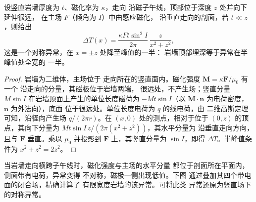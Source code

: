 \begin{proposition}[薄岩墙的异常]\label{prop:b3:field-lab-methods-3:dyke}
设竖直岩墙厚度为 $t$、磁化率为 $\kappa$，走向
沿磁子午线，顶部位于深度 $z$ 处并向下延伸很远，
在主场 $F$（倾角为 $I$）中由感应磁化，
沿垂直走向的剖面，若 $t \ll z$，则给出
\[
\Delta T(x) = \frac{\kappa F t\sin^2 I}{2\pi}\,\frac{z}{x^2 + z^2} ,
\]
这是一个对称异常，在 $x = \pm z$ 处降至峰值的一半：
岩墙顶部埋深等于异常在半峰值处全宽的
一半。
\end{proposition}

\begin{proof}
岩墙为二维体，主场位于
走向所在的竖直面内。磁化强度 $\mathbf{M} = \kappa\mathbf{F}/\mu_0$ 有一个
沿走向的分量，其磁极位于岩墙两端，
很远处，不产生场；竖直分量 $M
\sin I$ 在岩墙顶面上产生的单位长度磁荷为
$-Mt\sin I$（以 $\mathbf{M}\cdot\mathbf{n}$ 为电荷密度，
$\mathbf{n}$ 为外法向），底面
位于很远处。单位长度电荷为 $q$ 的线电荷，由
二维高斯定理可知，沿径向产生场 $q/(2\pi r)$。在
$(x, 0)$ 处的测点，相对于位于 $(0, z)$ 的顶点，其向下分量为
$Mt\sin I\,z/(2\pi(x^2 + z^2))$，其水平分量为
沿垂直走向方向，且与 $\mathbf{F}$ 垂直。乘以
$\mu_0$ 并投影到 $\mathbf{F}$ 上，其竖直分量为
$\sin I$，即得 $\Delta T$。半峰值条件为 $x^2 + z^2 =
2z^2$。
\end{proof}

当岩墙走向横跨子午线时，磁化强度与主场的水平分量
都位于剖面所在平面内，
侧面带有电荷，异常变得
不对称，磁极一侧出现低值。下图
通过叠加其四个带电面的闭合场，精确计算了
有限宽度岩墙的该异常。可将此类
异常还原为竖直场下的对称异常。

